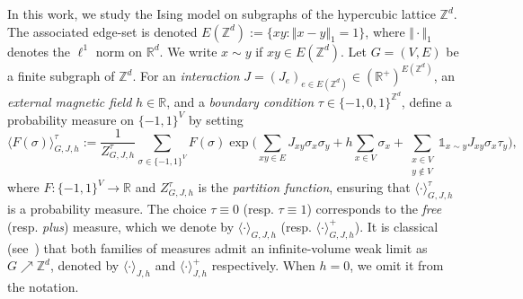 \documentclass[11pt,a4paper]{article}
\numberwithin{equation}{section}
\theoremstyle{plain}
\theoremstyle{definition}
\begin{document}
In this work, we study the Ising model on subgraphs of the hypercubic lattice  $\mathbb Z^d$. The associated edge-set is denoted 
$E(\mathbb{Z}^d):=\{xy:\Vert x-y\Vert_1=1\}$, where $\Vert\cdot\Vert_1$ 
denotes the $\ell^1$ norm on $\mathbb{R}^d$. We write $x\sim y$ if $xy\in E(\mathbb Z^d)$. Let $G=(V,E)$ be a 
finite subgraph of $\mathbb{Z}^d$. For an \emph{interaction} 
$J=(J_e)_{e\in E(\mathbb Z^d)}\in(\mathbb{R}^+)^{E(\mathbb Z^d)}$, an \emph{external magnetic field} 
$h\in\mathbb{R}$, and a \emph{boundary condition} 
$\tau\in\{-1,0,1\}^{\mathbb{Z}^d}$, define a probability measure on 
$\{-1,1\}^V$ by setting
\begin{equation}
    \langle F(\sigma)\rangle_{G,J,h}^\tau
    :=\frac{1}{Z^\tau_{G,J,h}}\sum_{\sigma\in\{-1,1\}^V}F(\sigma)
    \exp\Big(\sum_{xy\in E}J_{xy}\sigma_x\sigma_y
    +h\sum_{x\in V}\sigma_x
    +\sum_{\substack{x\in V\\y\notin V}}
    \mathds{1}_{x\sim y}J_{xy}\sigma_x\tau_y\Big),
\end{equation}
where $F:\{-1,1\}^V\rightarrow\mathbb{R}$ and $Z^{\tau}_{G,J,h}$ is the 
\emph{partition function}, ensuring that $\langle\cdot\rangle_{G,J,h}^\tau$ 
is a probability measure. The choice $\tau\equiv 0$ (resp. $\tau\equiv 1$) corresponds to the 
\emph{free} (resp. \emph{plus}) measure, which we denote by 
$\langle\cdot\rangle_{G,J,h}$ (resp. $\langle\cdot\rangle_{G,J,h}^+$). 
It is classical 
(see~\cite{GriffithsCorrelationsIsing1-1967,GriffithsCorrelationsIsing2-1967}) 
that both families of measures admit an infinite-volume weak limit as 
$G\nearrow\mathbb{Z}^d$, denoted by $\langle\cdot\rangle_{J,h}$ and 
$\langle\cdot\rangle_{J,h}^+$ respectively. When $h=0$, we omit it from 
the notation.
\end{document}
